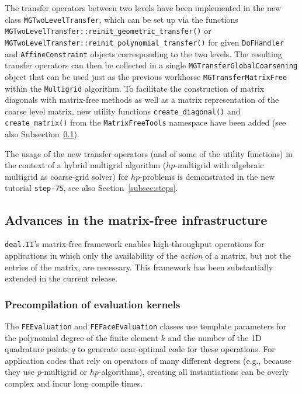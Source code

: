 \documentclass{ansarticle-preprint}
\newcommand{\specialword}[1]{\texttt{#1}}
\newcommand{\dealii}{{\specialword{deal.II}}\xspace}
\begin{document}
The transfer operators between two levels have been implemented in the new class \texttt{MGTwoLevel\allowbreak Transfer}, which can be set up via the functions \texttt{MGTwoLevel\allowbreak Transfer::\allowbreak reinit\_\allowbreak geometric\_\allowbreak transfer()} or \texttt{MGTwo\allowbreak LevelTransfer::\allowbreak reinit\_\allowbreak polynomial\_\allowbreak transfer()} for given
\texttt{DoFHandler} and \texttt{AffineConstraint} objects
corresponding to the two levels. The resulting transfer operators
can then be collected in a single
\texttt{MGTransfer\allowbreak GlobalCoarsening} object that can be used just as the previous workhorse \texttt{MGTransferMatrixFree} within the \texttt{Multigrid}
algorithm.
To facilitate the construction of matrix diagonals with matrix-free methods as well as a matrix representation of the coarse level matrix, new utility functions \texttt{create\_diagonal()} and \texttt{create\_matrix()} from
the \texttt{MatrixFreeTools} namespace have been added (see also Subsection~\ref{subsec:mf}).

The usage of the new transfer operators (and of some of the utility
functions) in the context of a hybrid multigrid algorithm
($hp$-multigrid with algebraic multigrid as coarse-grid solver) for $hp$-problems is demonstrated in the new tutorial \texttt{step-75}, see also Section~\ref{subsec:steps}.



\subsection{Advances in the matrix-free infrastructure}
\label{subsec:mf}

\dealii{}'s matrix-free framework enables high-throughput operations
for applications in which only the availability of the \textit{action}
of a matrix, but not the entries of the matrix, are necessary. This
framework has been substantially extended in the current release.


\subsubsection{Precompilation of evaluation kernels}

The \texttt{FEEvaluation} and \texttt{FEFaceEvaluation} classes use template parameters for
the polynomial degree of the finite element $k$ and the number of the 1D quadrature points $q$
to generate near-optimal code for these operations.
For application codes that rely on operators of many different degrees (e.g., because
they use $p$-multigrid or $hp$-algorithms), creating all instantiations
can be overly complex and incur long compile times.
\end{document}
